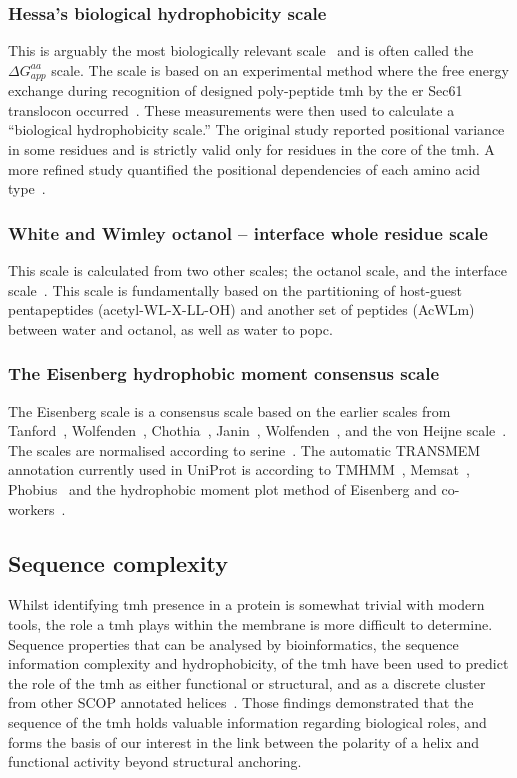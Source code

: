 \subsubsection{Hessa's biological hydrophobicity scale}
This is arguably the most biologically relevant scale~\cite{Peters2014} and is often called the ${\Delta G}_{app}^{aa}$ scale.
The scale is based on an experimental method where the free energy exchange during recognition of designed poly-peptide \gls{tmh} by the \gls{er} Sec61 translocon occurred~\cite{Hessa2005}.
These measurements were then used to calculate a “biological hydrophobicity scale.” The original study reported positional variance in some residues and is strictly valid only for residues in the core of the \gls{tmh}.
A more refined study quantified the positional dependencies of each amino acid type~\cite{Hessa2007}.

\subsubsection{White and Wimley octanol \--- interface whole residue scale}
This scale is calculated from two other scales; the octanol scale, and the interface scale~\cite{White1999}.
This scale is fundamentally based on the partitioning of host-guest pentapeptides (acetyl-WL-X-LL-OH) and another set of peptides (AcWLm) between water and octanol, as well as water to \gls{popc}.

\subsubsection{The Eisenberg hydrophobic moment consensus scale}
The Eisenberg scale is a consensus scale based on the earlier scales from Tanford~\cite{Nozaki1971}, Wolfenden~\cite{Rose1993}, Chothia~\cite{Chothia1976}, Janin~\cite{Janin1979},  Wolfenden~\cite{Wolfenden1981}, and the von Heijne scale~\cite{VonHeijne1979}.
The scales are normalised according to serine~\cite{Eisenberg1984}.
The automatic TRANSMEM annotation currently used in UniProt is according to TMHMM~\cite{Krogh2001}, Memsat~\cite{Jones2007}, Phobius~\cite{Kall2004} and the hydrophobic moment plot method of Eisenberg and co\--workers~\cite{Eisenberg1984}.

\subsection{Sequence complexity}
Whilst identifying \gls{tmh} presence in a protein is somewhat trivial with modern tools, the role a \gls{tmh} plays within the membrane is more difficult to determine.
Sequence properties that can be analysed by bioinformatics, the sequence information complexity and hydrophobicity, of the \gls{tmh} have been used to predict the role of the \gls{tmh} as either functional or structural, and as a discrete cluster from other SCOP annotated helices~\cite{Wong2012}.
Those findings demonstrated that the sequence of the \gls{tmh} holds valuable information regarding biological roles, and forms the basis of our interest in the link between the polarity of a helix and functional activity beyond structural anchoring.

